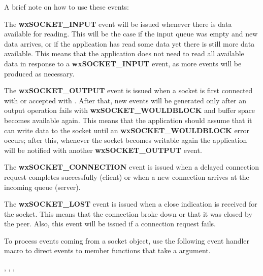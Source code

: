 A brief note on how to use these events:

The {\bf wxSOCKET\_INPUT} event will be issued whenever there is data
available for reading. This will be the case if the input queue was
empty and new data arrives, or if the application has read some data
yet there is still more data available. This means that the application
does not need to read all available data in response to a 
{\bf wxSOCKET\_INPUT} event, as more events will be produced as
necessary.

The {\bf wxSOCKET\_OUTPUT} event is issued when a socket is first
connected with  or accepted
with . After that, new
events will be generated only after an output operation fails
with {\bf wxSOCKET\_WOULDBLOCK} and buffer space becomes available
again. This means that the application should assume that it
can write data to the socket until an {\bf wxSOCKET\_WOULDBLOCK} 
error occurs; after this, whenever the socket becomes writable
again the application will be notified with another 
{\bf wxSOCKET\_OUTPUT} event.

The {\bf wxSOCKET\_CONNECTION} event is issued when a delayed connection
request completes successfully (client) or when a new connection arrives
at the incoming queue (server).

The {\bf wxSOCKET\_LOST} event is issued when a close indication is
received for the socket. This means that the connection broke down or
that it was closed by the peer. Also, this event will be issued if
a connection request fails.


To process events coming from a socket object, use the following event
handler macro to direct events to member functions that take
a  argument.

\twocolwidtha{7cm}%
\begin{twocollist}\itemsep=0pt
\end{twocollist}


, 
, 
, 


